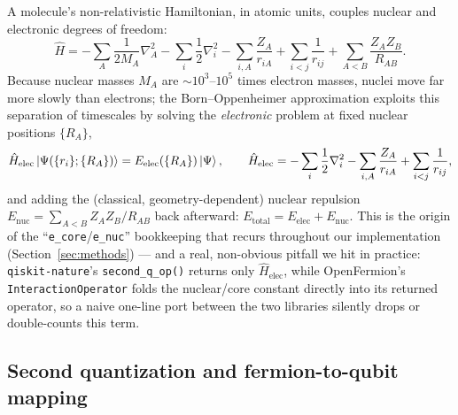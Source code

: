 \documentclass[11pt]{article}
\begin{document}
A molecule's non-relativistic Hamiltonian, in atomic units, couples nuclear and
electronic degrees of freedom:
\begin{equation}
  \hat{H} = -\sum_A \frac{1}{2M_A}\nabla_A^2 - \sum_i \frac{1}{2}\nabla_i^2
  - \sum_{i,A}\frac{Z_A}{r_{iA}} + \sum_{i<j}\frac{1}{r_{ij}}
  + \sum_{A<B}\frac{Z_A Z_B}{R_{AB}}.
\end{equation}
Because nuclear masses $M_A$ are $\sim\!10^3$--$10^5$ times electron masses,
nuclei move far more slowly than electrons; the Born--Oppenheimer
approximation exploits this separation of timescales by solving the
\emph{electronic} problem at fixed nuclear positions $\{R_A\}$,
\begin{equation}
  \hat{H}_{\text{elec}}\ket{\Psi(\{r_i\}; \{R_A\})}
  = E_{\text{elec}}(\{R_A\})\ket{\Psi},
  \qquad
  \hat{H}_{\text{elec}} = -\sum_i\frac{1}{2}\nabla_i^2 - \sum_{i,A}\frac{Z_A}{r_{iA}}
  + \sum_{i<j}\frac{1}{r_{ij}},
\end{equation}
and adding the (classical, geometry-dependent) nuclear repulsion
$E_{\text{nuc}} = \sum_{A<B} Z_AZ_B/R_{AB}$ back afterward:
$E_{\text{total}} = E_{\text{elec}} + E_{\text{nuc}}$. This is the origin of
the ``\texttt{e\_core}/\texttt{e\_nuc}'' bookkeeping that recurs throughout our
implementation (Section~\ref{sec:methods}) --- and a real, non-obvious pitfall
we hit in practice: \texttt{qiskit-nature}'s \texttt{second\_q\_op()} returns
only $\hat{H}_{\text{elec}}$, while OpenFermion's \texttt{InteractionOperator}
folds the nuclear/core constant directly into its returned operator, so a
naive one-line port between the two libraries silently drops or double-counts
this term.

\subsection{Second quantization and fermion-to-qubit mapping}
\label{subsec:mapping}
\end{document}
